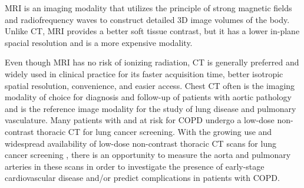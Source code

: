 MRI is an imaging modality that utilizes the principle of strong magnetic fields and radiofrequency waves to construct detailed 3D image volumes of the body. Unlike CT, MRI provides a better soft tissue contrast, but it has a lower in-plane spacial resolution and is a more expensive modality. 

Even though MRI has no risk of ionizing radiation, \gls{CT} is generally preferred and widely used in clinical practice for its faster acquisition time, better isotropic spatial resolution, convenience, and easier access. Chest CT often is the imaging modality of choice for diagnosis and follow-up of patients with aortic pathology and is the reference image modality for the study of lung disease and pulmonary vasculature. Many patients with and at risk for \gls{COPD} undergo a low-dose non-contrast thoracic CT for lung cancer screening. With the growing use and widespread availability of low-dose non-contrast thoracic CT scans for lung cancer screening \autocite{pedersen2009danish, oudkerk2017european}, there is an opportunity to measure the aorta and pulmonary arteries in these scans in order to investigate the presence of early-stage cardiovascular disease and/or predict complications in patients with \gls{COPD}.










